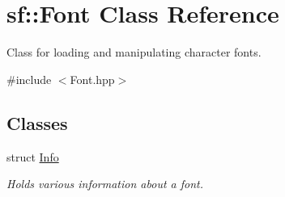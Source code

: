 \hypertarget{classsf_1_1_font}{\section{sf\-:\-:Font Class Reference}
\label{classsf_1_1_font}
}


Class for loading and manipulating character fonts.  




{\ttfamily \#include $<$Font.\-hpp$>$}

\subsection*{Classes}
\begin{DoxyCompactItemize}
\item 
struct \hyperlink{structsf_1_1_font_1_1_info}{Info}
\begin{DoxyCompactList}\small\item\em Holds various information about a font. \end{DoxyCompactList}\end{DoxyCompactItemize}
